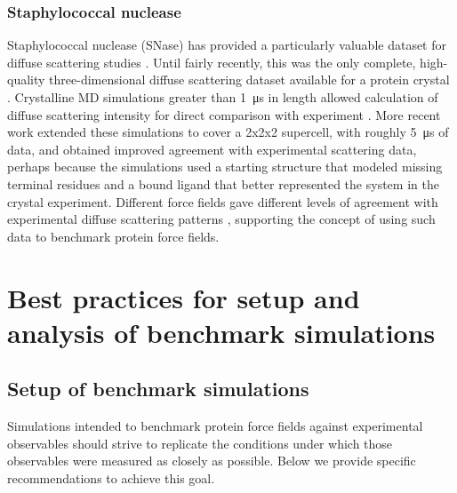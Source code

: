 \documentclass[9pt,review]{livecoms}
\begin{document}
\subsubsection{Staphylococcal nuclease}
\label{sub2:staph_nuclease}

Staphylococcal nuclease (SNase) has provided a particularly valuable dataset for diffuse scattering studies \cite{wall_three-dimensional_1997}.
Until fairly recently, this was the only complete, high-quality three-dimensional diffuse scattering dataset available for a protein crystal \cite{wall_conformational_2014}.
Crystalline MD simulations greater than \qty{1}{\micro\second} in length allowed calculation of diffuse scattering intensity for direct comparison with experiment \cite{wall_conformational_2014}.
More recent work \cite{wall_internal_2018} extended these simulations to cover a 2x2x2 supercell, with roughly \qty{5}{\micro\second} of data, and obtained improved agreement with experimental scattering data, perhaps because the simulations used a starting structure that modeled missing terminal residues and a bound ligand that better represented the system in the crystal experiment.
Different force fields gave different levels of agreement with experimental diffuse scattering patterns \cite{wych_liquid-like_2019}, supporting the concept of using such data to benchmark protein force fields.

\section{Best practices for setup and analysis of benchmark simulations}
\label{sec:best_practices}

\subsection{Setup of benchmark simulations}
\label{sub:best_practices_setup}

Simulations intended to benchmark protein force fields against experimental observables should strive to replicate the conditions under which those observables were measured as closely as possible. Below we provide specific recommendations to achieve this goal.
\end{document}
